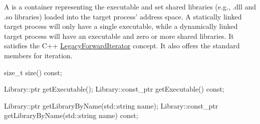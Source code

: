 
A  is a container representing the executable
and set shared libraries (e.g., .dll and .so libraries) loaded into the target
process' address space. A statically linked target
process will only have a single executable, while a dynamically linked target
process will have an executable and zero or more shared libraries. It satisfies
the C++
\href{https://en.cppreference.com/cpp/named_req/ForwardIterator}{LegacyForwardIterator}
concept. It also offers the standard  members for iteration.

\begin{apient}
  size_t size() const;
\end{apient}


\begin{apient}
  Library::ptr getExecutable();
  Library::const_ptr getExecutable() const;
\end{apient}


\begin{apient}
  Library::ptr getLibraryByName(std::string name);
  Library::const_ptr getLibraryByName(std::string name) const;
\end{apient}

